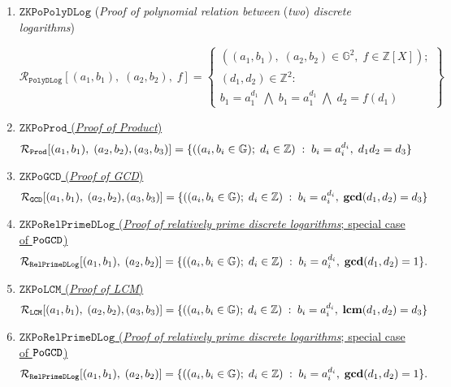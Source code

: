 \documentclass[11pt, lettersize, notitlepage, leqno, footskip=0.6cm]{article}
\newcommand{\bz}{\mathbb Z}
\newcommand{\ttt}{\texttt}
\newcommand{\mc}{\mathcal}
\newcommand{\mb}{\mathbb}
\newcommand{\mbf}{\mathbf}
\newcommand{\vs}{\vspace{-0.15cm}}
\newcommand{\LCM}{\mbf{lcm}}
\newcommand{\GCD}{\mbf{gcd}}
\numberwithin{equation}{section}
\begin{document}
{{{\begin{enumerate}[wide, labelwidth=!, labelindent=0pt]
\[
  \mc{R}_{{\ttt{EqDLog}}}[(a_1, b_1),\;(a_2,b_2)] = \left\{\begin{array}{l}
    ((a_1, b_1), \; (a_2,b_2)\in\mb{G}^2\\
    d\in\mb{Z}): \\
    (b_1,b_2) = (a_1^d,a_2^d)
  \end{array}\right\}
\]

 

\item $\ttt{ZKPoPolyDLog}$ (\textit{Proof of polynomial relation between} (\textit{two}) \textit{discrete logarithms})\vspace{-0.3cm}

\[
  \mc{R}_{{\ttt{PolyDLog}}}[(a_1, b_1),\;(a_2,b_2),\;f] = \left\{\begin{array}{l}
    ((a_1, b_1), \; (a_2,b_2)\in\mb{G}^2,\;f\in\bz[X]);\\
    (d_1, d_2)\in\mb{Z}^2: \\
    b_1 = a_1^{d_1}\; \bigwedge\; b_1 = a_1^{d_1}\; \bigwedge \;d_2 = f(d_1)
  \end{array}\right\}
\]

\item \hyperlink{GCD}{$\ttt{ZKPoProd}$ (\textit{Proof of Product})} \vspace{-0.15cm} $$\mc{R}_{{\ttt{Prod}}}[(a_1,b_1),\; (a_2,b_2),(a_3,b_3)] = \{((a_i, b_i\in\mb{G});\;d_i\in\bz)\;:\; b_i = a_i^{d_i},\;d_1d_2 = d_3  \} \vs $$


\item \hyperlink{GCD}{$\ttt{ZKPoGCD}$ (\textit{Proof of GCD})} \vspace{-0.15cm} $$\mc{R}_{{\ttt{GCD}}}[(a_1,b_1),\; (a_2,b_2),(a_3,b_3)] = \{((a_i, b_i\in\mb{G});\;d_i\in\bz)\;:\; b_i = a_i^{d_i},\;\GCD(d_1,d_2)=d_3  \} \vs $$


\item \hyperlink{RP}{$\ttt{ZKPoRelPrimeDLog}$ (\textit{Proof of relatively prime discrete logarithms}; special case of $\tt{PoGCD}$)} \vs $$ \mc{R}_{\ttt{RelPrimeDLog}}[(a_1,b_1),\;(a_2,b_2)] = \{((a_i, b_i\in\mb{G});\;d_i\in\bz)\;:\; b_i = a_i^{d_i},\;\GCD(d_1,d_2)=1 \} . \vs $$


\item \hyperlink{LCM}{$\ttt{ZKPoLCM}$ (\textit{Proof of LCM})} \vspace{-0.15cm} $$\mc{R}_{{\ttt{LCM}}}[(a_1,b_1),\; (a_2,b_2),(a_3,b_3)] = \{((a_i, b_i\in\mb{G});\;d_i\in\bz)\;:\; b_i = a_i^{d_i},\;\LCM(d_1,d_2)=d_3  \} \vs $$


\item \hyperlink{RP}{$\ttt{ZKPoRelPrimeDLog}$ (\textit{Proof of relatively prime discrete logarithms}; special case of $\tt{PoGCD}$)} \vs $$ \mc{R}_{\ttt{RelPrimeDLog}}[(a_1,b_1),\;(a_2,b_2)] = \{((a_i, b_i\in\mb{G});\;d_i\in\bz)\;:\; b_i = a_i^{d_i},\;\GCD(d_1,d_2)=1 \} . \vs $$



\end{enumerate}}}}
\end{document}
